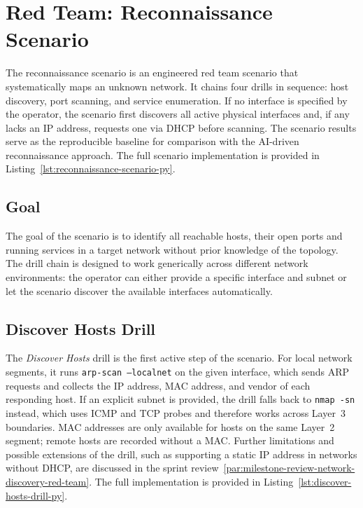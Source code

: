 \section{Red Team: Reconnaissance Scenario}\label{sec:reconnaissance-scenario-implementation}

The reconnaissance scenario is an engineered red team scenario that systematically maps an unknown network.
It chains four drills in sequence: host discovery, port scanning, and service enumeration.
If no interface is specified by the operator, the scenario first discovers all active physical interfaces and, if any lacks an IP address, requests one via \gls{DHCP} before scanning.
The scenario results serve as the reproducible baseline for comparison with the \gls{AI}-driven reconnaissance approach.
The full scenario implementation is provided in Listing~\ref{lst:reconnaissance-scenario-py}.

\subsection{Goal}\label{subsec:reconnaissance-scenario-goal}

The goal of the scenario is to identify all reachable hosts, their open ports and running services in a target network without prior knowledge of the topology.
The drill chain is designed to work generically across different network environments: the operator can either provide a specific interface and subnet or let the scenario discover the available interfaces automatically.

\subsection{Discover Hosts Drill}\label{subsec:reconnaissance-drill-discover-hosts}

The \textit{Discover Hosts} drill is the first active step of the scenario.
For local network segments, it runs \texttt{arp-scan --localnet} on the given interface, which sends \gls{ARP} requests and collects the \gls{IP} address, \gls{MAC} address, and vendor of each responding host.
If an explicit subnet is provided, the drill falls back to \texttt{nmap -sn} instead, which uses \gls{ICMP} and \gls{TCP} probes and therefore works across Layer~3 boundaries.
\gls{MAC} addresses are only available for hosts on the same Layer~2 segment; remote hosts are recorded without a \gls{MAC}.
Further limitations and possible extensions of the drill, such as supporting a static \gls{IP} address in networks without \gls{DHCP}, are discussed in the sprint review~\ref{par:milestone-review-network-discovery-red-team}.
The full implementation is provided in Listing~\ref{lst:discover-hosts-drill-py}.

